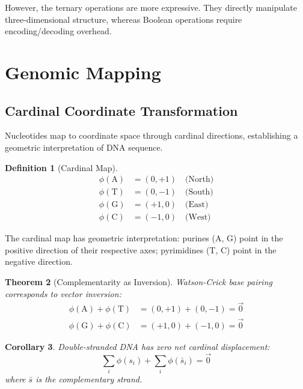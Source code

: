 \documentclass[twocolumn,10pt]{article}
\newtheorem{theorem}{Theorem}[section]
\newtheorem{corollary}[theorem]{Corollary}
\newtheorem{definition}[theorem]{Definition}
\theoremstyle{remark}
\begin{document}
However, the ternary operations are more expressive. They directly manipulate three-dimensional structure, whereas Boolean operations require encoding/decoding overhead.

\section{Genomic Mapping}

\subsection{Cardinal Coordinate Transformation}

Nucleotides map to coordinate space through cardinal directions, establishing a geometric interpretation of DNA sequence.

\begin{definition}[Cardinal Map]
\label{def:cardinal}
\begin{align}
\phi(\text{A}) &= (0, +1) \quad \text{(North)} \\
\phi(\text{T}) &= (0, -1) \quad \text{(South)} \\
\phi(\text{G}) &= (+1, 0) \quad \text{(East)} \\
\phi(\text{C}) &= (-1, 0) \quad \text{(West)}
\end{align}
\end{definition}

The cardinal map has geometric interpretation: purines (A, G) point in the positive direction of their respective axes; pyrimidines (T, C) point in the negative direction.

\begin{theorem}[Complementarity as Inversion]
\label{thm:cardinal_complement}
Watson-Crick base pairing corresponds to vector inversion:
\begin{align}
\phi(\text{A}) + \phi(\text{T}) &= (0,+1) + (0,-1) = \vec{0} \\
\phi(\text{G}) + \phi(\text{C}) &= (+1,0) + (-1,0) = \vec{0}
\end{align}
\end{theorem}

\begin{corollary}
Double-stranded DNA has zero net cardinal displacement:
\begin{equation}
\sum_{i} \phi(s_i) + \sum_{i} \phi(\bar{s}_i) = \vec{0}
\end{equation}
where $\bar{s}$ is the complementary strand.
\end{corollary}
\end{document}
